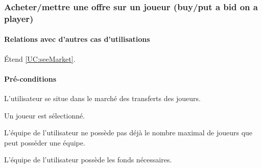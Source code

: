 
\subsubsection{Acheter/mettre une offre sur un joueur (buy/put a bid on a player)}
\label{UC:buyPlayer}
\paragraph{Relations avec d'autres cas d'utilisations}
Étend \ref{UC:seeMarket}.
\paragraph{Pré-conditions}
\begin{list}{}{\leftmargin=1.5em}
\item{L'utilisateur se situe dans le marché des transferts des joueurs.}
\item{Un joueur est sélectionné.}
\item{L'équipe de l'utilisateur ne possède pas déjà le nombre maximal de joueurs que peut posséder une équipe.}
\item{L'équipe de l'utilisateur possède les fonds nécessaires.}
\end{list}
